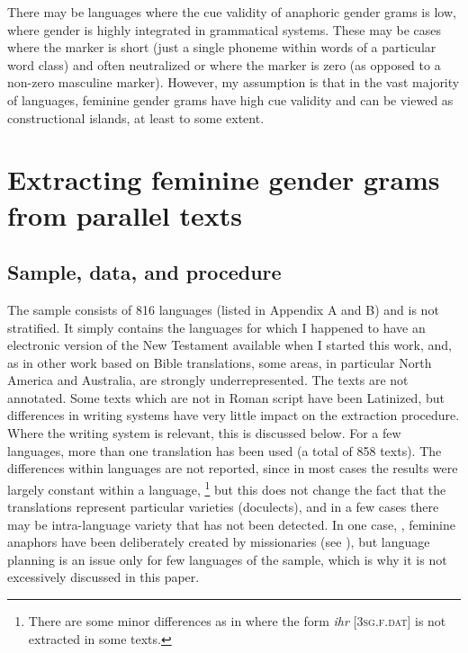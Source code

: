 \documentclass[output=collectionpaper]{langsci/langscibook}
\begin{document}
There may be languages where the cue validity of anaphoric gender grams is low, where gender is highly integrated in grammatical systems. These may be cases where the marker is short (just a single phoneme within words of a particular word class) and often neutralized or where the marker is zero (as opposed to a non-zero masculine marker). However, my assumption is that in the vast majority of languages, feminine gender grams have high cue validity and can be viewed as constructional islands, at least to some extent.


\section{Extracting feminine gender grams from parallel texts}
\label{sec:BW:3}

\subsection{Sample, data, and procedure}
\label{sec:BW:3.1}

The sample consists of 816 languages (listed in Appendix A and B) and is not stratified. It simply contains the languages for which I happened to have an electronic version of the New Testament available when I started this work, and, as in other work based on Bible translations, some areas, in particular North America and Australia, are strongly underrepresented. The texts are not annotated. Some texts which are not in Roman script have been Latinized, but differences in writing systems have very little impact on the extraction procedure. Where the writing system is relevant, this is discussed below. For a few languages, more than one translation has been used (a total of 858 texts). The differences within languages are not reported, since in most cases the results were largely constant within a language,%
\footnote{%
There are some minor differences as in  where the form \textit{ihr} [\textsc{3sg.f.dat}] is not extracted in some texts.
} %
but this does not change the fact that the translations represent particular varieties (doculects), and in a few cases there may be intra-language variety that has not been detected. In one case, , feminine anaphors have been deliberately created by missionaries (see ), but language planning is an issue only for few languages of the sample, which is why it is not excessively discussed in this paper.
\end{document}
